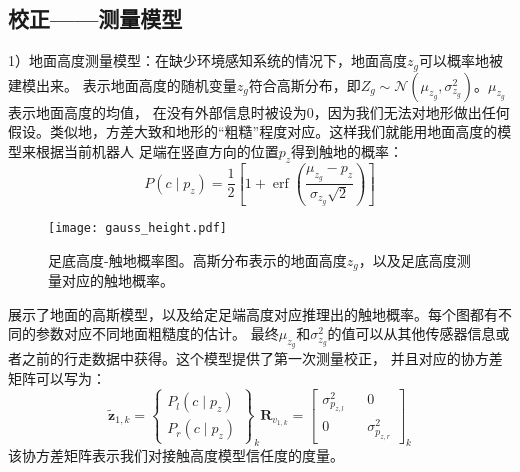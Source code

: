 \subsection{校正——测量模型}

1）地面高度测量模型：在缺少环境感知系统的情况下，地面高度$z_g$可以概率地被建模出来。
表示地面高度的随机变量$z_g$符合高斯分布，即$Z_g \sim \mathcal{N}\left(\mu_{z_g}, \sigma_{z_g}^2\right)$。$\mu_{z_g}$表示地面高度的均值，
在没有外部信息时被设为0，因为我们无法对地形做出任何假设。类似地，方差大致和地形的“粗糙”程度对应。这样我们就能用地面高度的模型来根据当前机器人
足端在竖直方向的位置$p_z$得到触地的概率：
\begin{equation}
    \label{equ:est_height_prob}
    P\left(c \mid p_z\right)=\frac{1}{2}\left[1+\operatorname{erf}\left(\frac{\mu_{z_g}-p_z}{\sigma_{z_g} \sqrt{2}}\right)\right]
\end{equation}
\begin{figure}[htbp]
    \centering
    \texttt{[image: gauss\_height.pdf]}
    \caption{\label{fig:gauss_height}足底高度-触地概率图。高斯分布表示的地面高度${{z}_{g}}$，以及足底高度测量对应的触地概率。}
\end{figure}
展示了地面的高斯模型，以及给定足端高度对应推理出的触地概率。每个图都有不同的参数对应不同地面粗糙度的估计。
最终$\mu_{z_g}$和$\sigma_{z_g}^2$的值可以从其他传感器信息或者之前的行走数据中获得。这个模型提供了第一次测量校正，
并且对应的协方差矩阵可以写为：
\begin{equation}
    \label{equ:est_height_noise}
    \tilde{\boldsymbol{z}}_{1, k}=\left\{\begin{array}{c}
        P_l\left(c \mid p_z\right) \\
        P_r\left(c \mid p_z\right)
        \end{array}\right\}_k \boldsymbol{R}_{v_{1, k}}=\left[\begin{array}{ccc}
        \sigma_{p_{z, l}}^2 & & 0 \\
        0 & & \sigma_{p_{z, r}}^2
        \end{array}\right]_k
\end{equation}
该协方差矩阵表示我们对接触高度模型信任度的度量。

